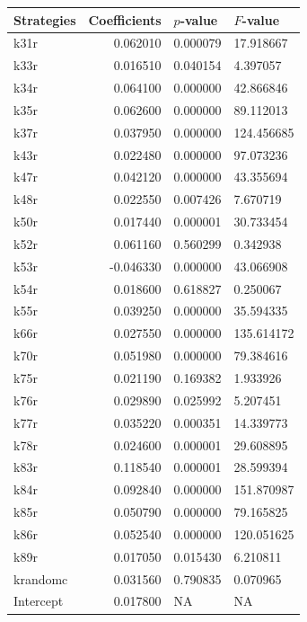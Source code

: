 \begin{tabular}{lrll}
\toprule
Strategies & Coefficients & $p$-value & $F$-value \\
\midrule
k31r & 0.062010 & 0.000079 & 17.918667 \\
k33r & 0.016510 & 0.040154 & 4.397057 \\
k34r & 0.064100 & 0.000000 & 42.866846 \\
k35r & 0.062600 & 0.000000 & 89.112013 \\
k37r & 0.037950 & 0.000000 & 124.456685 \\
k43r & 0.022480 & 0.000000 & 97.073236 \\
k47r & 0.042120 & 0.000000 & 43.355694 \\
k48r & 0.022550 & 0.007426 & 7.670719 \\
k50r & 0.017440 & 0.000001 & 30.733454 \\
k52r & 0.061160 & 0.560299 & 0.342938 \\
k53r & -0.046330 & 0.000000 & 43.066908 \\
k54r & 0.018600 & 0.618827 & 0.250067 \\
k55r & 0.039250 & 0.000000 & 35.594335 \\
k66r & 0.027550 & 0.000000 & 135.614172 \\
k70r & 0.051980 & 0.000000 & 79.384616 \\
k75r & 0.021190 & 0.169382 & 1.933926 \\
k76r & 0.029890 & 0.025992 & 5.207451 \\
k77r & 0.035220 & 0.000351 & 14.339773 \\
k78r & 0.024600 & 0.000001 & 29.608895 \\
k83r & 0.118540 & 0.000001 & 28.599394 \\
k84r & 0.092840 & 0.000000 & 151.870987 \\
k85r & 0.050790 & 0.000000 & 79.165825 \\
k86r & 0.052540 & 0.000000 & 120.051625 \\
k89r & 0.017050 & 0.015430 & 6.210811 \\
krandomc & 0.031560 & 0.790835 & 0.070965 \\
Intercept & 0.017800 & NA & NA \\
\bottomrule
\end{tabular}
